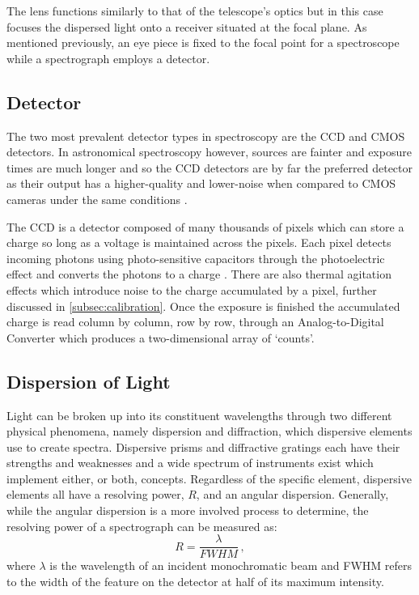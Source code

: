 The lens functions similarly to that of the telescope's optics but in this case focuses the dispersed light onto a receiver situated at the focal plane.
As mentioned previously, an eye piece is fixed to the focal point for a spectroscope while a spectrograph employs a detector.

\subsection{Detector}

The two most prevalent detector types in spectroscopy are the \gls{CCD} and \gls{CMOS} detectors.
In astronomical spectroscopy however, sources are fainter and exposure times are much longer and so the \gls{CCD} detectors are by far the preferred detector as their output has a higher-quality and lower-noise when compared to \gls{CMOS} cameras under the same conditions \citep{CCDvsCMOS}.

The \gls{CCD} is a detector composed of many thousands of pixels which can store a charge so long as a voltage is maintained across the pixels.
Each pixel detects incoming photons using photo-sensitive capacitors through the photoelectric effect and converts the photons to a charge \citep{CCDastronomy}.
There are also thermal agitation effects which introduce noise to the charge accumulated by a pixel, further discussed in \autoref{subsec:calibration}.
Once the exposure is finished the accumulated charge is read column by column, row by row, through an Analog-to-Digital Converter which produces a two-dimensional array of `counts'.


\subsection{Dispersion of Light} \label{subsec:dispersion}

Light can be broken up into its constituent wavelengths through two different physical phenomena, namely dispersion and diffraction, which dispersive elements use to create spectra.
Dispersive prisms and diffractive gratings each have their strengths and weaknesses and a wide spectrum of instruments exist which implement either, or both, concepts.
Regardless of the specific element, dispersive elements all have a resolving power, $R$, and an angular dispersion.
Generally, while the angular dispersion is a more involved process to determine, the resolving power of a spectrograph can be measured as:
\begin{equation} \label{eq:resolving_power}
    R = \frac{\lambda}{FWHM}\,,
\end{equation}
where $\lambda$ is the wavelength of an incident monochromatic beam and \gls{FWHM} refers to the width of the feature on the detector at half of its maximum intensity.

